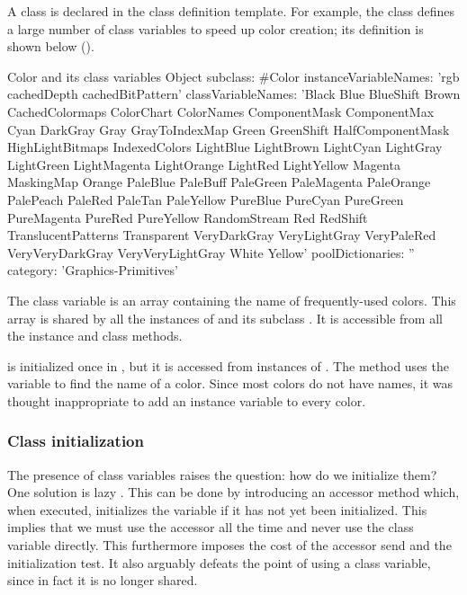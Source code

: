 \documentclass[a4paper,10pt,twoside]{book}
\begin{document}
A class  is declared in the class definition template.
For example, the class  defines a large number of class variables to speed up color creation; its definition is shown below ().
\begin{classdef}[Color]{Color and its class variables}
Object subclass: #Color 	
        instanceVariableNames: 'rgb cachedDepth cachedBitPattern'
        classVariableNames: 'Black Blue BlueShift Brown CachedColormaps ColorChart ColorNames ComponentMask ComponentMax Cyan DarkGray Gray GrayToIndexMap Green GreenShift HalfComponentMask HighLightBitmaps IndexedColors LightBlue LightBrown LightCyan LightGray LightGreen LightMagenta LightOrange LightRed LightYellow Magenta MaskingMap Orange PaleBlue PaleBuff PaleGreen PaleMagenta PaleOrange PalePeach PaleRed PaleTan PaleYellow PureBlue PureCyan PureGreen PureMagenta PureRed PureYellow RandomStream Red RedShift TranslucentPatterns Transparent VeryDarkGray VeryLightGray VeryPaleRed VeryVeryDarkGray VeryVeryLightGray White Yellow'
        poolDictionaries: '' 	
        category: 'Graphics-Primitives'
\end{classdef}

The class variable  is an array containing the name of frequently-used colors. This array is shared by all the instances of  and its subclass . It is accessible from all the instance and class methods. %

 is initialized once in , but it is accessed from instances of .
The method  uses the variable to find the name of a color.
Since most colors do not have names, it was thought inappropriate to add an instance variable  to every color.

\subsubsection{Class initialization}

The presence of class variables raises the question: how do we initialize them?  
One solution is lazy .
This can be done by introducing an accessor method which, when executed, initializes the variable if it has not yet been initialized. This implies that we must use the accessor all the time and never use the class variable directly.  This furthermore imposes the cost of the accessor send and the initialization test.
It also arguably defeats the point of using a class variable, since in fact it is no longer shared.
\end{document}

